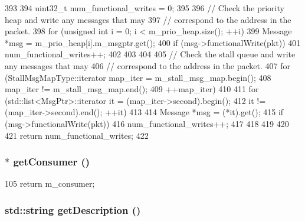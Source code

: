 \begin{DoxyCode}
393 {
394     uint32_t num_functional_writes = 0;
395 
396     // Check the priority heap and write any messages that may
397     // correspond to the address in the packet.
398     for (unsigned int i = 0; i < m_prio_heap.size(); ++i) {
399         Message *msg = m_prio_heap[i].m_msgptr.get();
400         if (msg->functionalWrite(pkt)) {
401             num_functional_writes++;
402         }
403     }
404 
405     // Check the stall queue and write any messages that may
406     // correspond to the address in the packet.
407     for (StallMsgMapType::iterator map_iter = m_stall_msg_map.begin();
408          map_iter != m_stall_msg_map.end();
409          ++map_iter) {
410 
411         for (std::list<MsgPtr>::iterator it = (map_iter->second).begin();
412             it != (map_iter->second).end(); ++it) {
413 
414             Message *msg = (*it).get();
415             if (msg->functionalWrite(pkt)) {
416                 num_functional_writes++;
417             }
418         }
419     }
420 
421     return num_functional_writes;
422 }
\end{DoxyCode}
\hypertarget{classMessageBuffer_a2417fc7252a612b5c976ceaa2d1be4f7}{
\subsubsection[{getConsumer}]{$\ast$ getConsumer ()}}
\label{classMessageBuffer_a2417fc7252a612b5c976ceaa2d1be4f7}



\begin{DoxyCode}
105 { return m_consumer; }
\end{DoxyCode}
\hypertarget{classMessageBuffer_a73da75c3e5ec30855a02eae2ba824e38}{
\subsubsection[{getDescription}]{\setlength{\rightskip}{0pt plus 5cm}std::string getDescription ()}}
\label{classMessageBuffer_a73da75c3e5ec30855a02eae2ba824e38}



